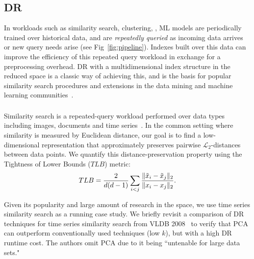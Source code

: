 \subsection{DR }

In workloads such as similarity search, clustering, , ML models are periodically trained over historical data, and are \emph{repeatedly queried} as incoming data arrives or new query needs arise (see Fig~\ref{fig:pipeline}). 
Indexes built over this data can improve the efficiency of this repeated query workload in exchange for a preprocessing overhead.
DR with a multidimensional index structure in the reduced space is a classic way of achieving this, and is the basis for popular similarity search procedures and extensions in the data mining and machine learning communities~\cite{local-dr,dynamic-ss,dm-book,humming-index,decade,search}.


\subsubsection*{}
Similarity search is a repeated-query workload performed over data types including images, documents and time series~\cite{keogh-study,lsh}.
In the common setting where similarity is measured by Euclidean distance, our goal is to find a low-dimensional representation that approximately preserves pairwise $\mathcal{L}_2$-distances between data points. We quantify this distance-preservation property using the Tightness of Lower Bounds ($TLB$) metric\cite{keogh-study}:  
\begin{equation}
\label{eq:tlb}
TLB = \frac{2}{{\color{black}d}({\color{black}d}-1)}\sum_{i<j}\frac{\| \tilde{x}_i -  \tilde{x}_j \|_2 }{\| x_i -  x_j\|_2 }.
\end{equation}

Given its popularity and large amount of research in the space, we use time series similarity search as a running case study. 
We briefly revisit a comparison of DR techniques for time series similarity search from VLDB 2008~\cite{keogh-study} to verify that PCA can outperform conventionally used techniques (low $k$), but with a high DR runtime cost.
The authors omit PCA due to it being ``untenable for large data sets." 

